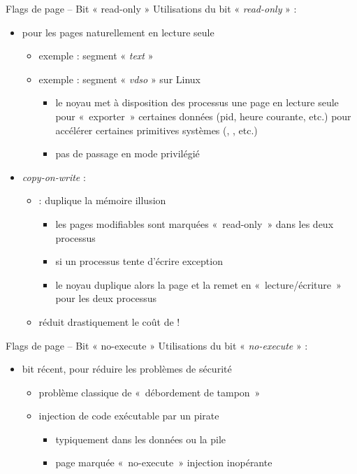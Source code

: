 \begin {frame} {Flags de page -- Bit « read-only »}
    Utilisations du bit « \textit {read-only} » : 
    \begin {itemize}
	\item pour les pages naturellement en lecture seule
	    \begin {itemize}
		\item exemple : segment « \textit {text} »
		\item exemple : segment « \textit {vdso} » sur Linux
		    \begin {itemize}
			\item le noyau met à disposition des processus
			    une page en lecture seule pour «~exporter~»
			    certaines données (pid, heure courante, etc.)
			    pour accélérer certaines primitives systèmes
			    (, , etc.)
			\item pas de passage en mode privilégié
		    \end {itemize}
	    \end {itemize}
	\item \textit {copy-on-write} :
	    \begin {itemize}
		\item {} : duplique la mémoire \implique illusion
		    \begin {itemize}
			\item les pages modifiables sont marquées «~read-only~»
			    dans les deux processus
			\item si un processus tente d'écrire \implique exception
			\item le noyau duplique alors la page et la remet
			    en «~lecture/écriture~» pour les deux processus
		    \end {itemize}
		\item réduit drastiquement le coût de  !
	    \end {itemize}
    \end {itemize}
\end {frame}

\begin {frame} {Flags de page -- Bit « no-execute »}
    Utilisations du bit « \textit {no-execute} » : 
    \begin {itemize}
	\item bit récent, pour réduire les problèmes de sécurité
	\begin {itemize}
	    \item problème classique de «~débordement de tampon~»
	    \item injection de code exécutable par un pirate
		\begin {itemize}
		    \item typiquement dans les données ou la pile
		    \item page marquée «~no-execute~» \implique
			injection inopérante
		\end {itemize}
	\end {itemize}
    \end {itemize}
\end {frame}

